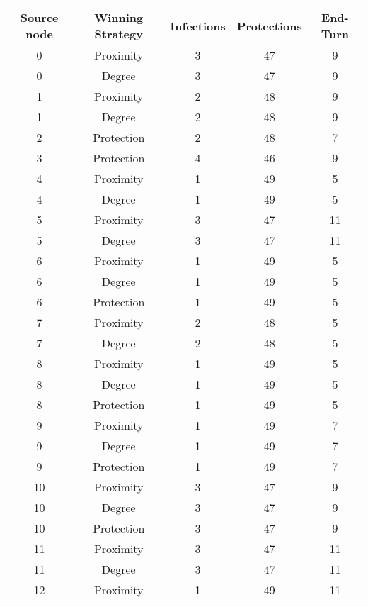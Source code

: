 \documentclass[results.tex]{subfiles}
\begin{document}
\begin{center}
  \begin{tabular}{| c || c | c | c | c |}
    \hline
    {\bfseries Source node} & {\bfseries Winning Strategy} & {\bfseries Infections} & {\bfseries Protections} & {\bfseries End-Turn} \\  %
    \hline\hline
    0 & Proximity & 3 & 47 & 9 \\ 
    \hline
    0 & Degree & 3 & 47 & 9 \\ 
    \hline
    1 & Proximity & 2 & 48 & 9 \\ 
    \hline
    1 & Degree & 2 & 48 & 9 \\ 
    \hline
    2 & Protection & 2 & 48 & 7 \\ 
    \hline
    3 & Protection & 4 & 46 & 9 \\ 
    \hline
    4 & Proximity & 1 & 49 & 5 \\ 
    \hline
    4 & Degree & 1 & 49 & 5 \\ 
    \hline
    5 & Proximity & 3 & 47 & 11 \\ 
    \hline
    5 & Degree & 3 & 47 & 11 \\ 
    \hline
    6 & Proximity & 1 & 49 & 5 \\ 
    \hline
    6 & Degree & 1 & 49 & 5 \\ 
    \hline
    6 & Protection & 1 & 49 & 5 \\ 
    \hline
    7 & Proximity & 2 & 48 & 5 \\ 
    \hline
    7 & Degree & 2 & 48 & 5 \\ 
    \hline
    8 & Proximity & 1 & 49 & 5 \\ 
    \hline
    8 & Degree & 1 & 49 & 5 \\ 
    \hline
    8 & Protection & 1 & 49 & 5 \\ 
    \hline
    9 & Proximity & 1 & 49 & 7 \\ 
    \hline
    9 & Degree & 1 & 49 & 7 \\ 
    \hline
    9 & Protection & 1 & 49 & 7 \\ 
    \hline
    10 & Proximity & 3 & 47 & 9 \\ 
    \hline
    10 & Degree & 3 & 47 & 9 \\ 
    \hline
    10 & Protection & 3 & 47 & 9 \\ 
    \hline
    11 & Proximity & 3 & 47 & 11 \\ 
    \hline
    11 & Degree & 3 & 47 & 11 \\ 
    \hline
    12 & Proximity & 1 & 49 & 11 \\ 

\end{tabular}
\end{center}
\end{document}
